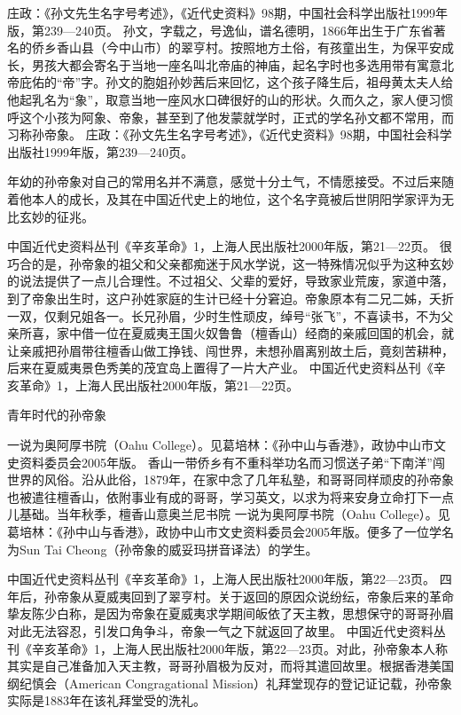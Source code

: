 \documentclass[12pt,UTF8]{ctexbook}
\begin{document}
庄政：《孙文先生名字号考述》，《近代史资料》98期，中国社会科学出版社1999年版，第239—240页。
孙文，字载之，号逸仙，谱名德明，1866年出生于广东省著名的侨乡香山县（今中山市）的翠亨村。按照地方土俗，有孩童出生，为保平安成长，男孩大都会寄名于当地一座名叫北帝庙的神庙，起名字时也多选用带有寓意北帝庇佑的“帝”字。孙文的胞姐孙妙茜后来回忆，这个孩子降生后，祖母黄太夫人给他起乳名为“象”，取意当地一座风水口碑很好的山的形状。久而久之，家人便习惯呼这个小孩为阿象、帝象，甚至到了他发蒙就学时，正式的学名孙文都不常用，而习称孙帝象。 庄政：《孙文先生名字号考述》，《近代史资料》98期，中国社会科学出版社1999年版，第239—240页。

年幼的孙帝象对自己的常用名并不满意，感觉十分土气，不情愿接受。不过后来随着他本人的成长，及其在中国近代史上的地位，这个名字竟被后世阴阳学家评为无比玄妙的征兆。

中国近代史资料丛刊《辛亥革命》1，上海人民出版社2000年版，第21—22页。
很巧合的是，孙帝象的祖父和父亲都痴迷于风水学说，这一特殊情况似乎为这种玄妙的说法提供了一点儿合理性。不过祖父、父辈的爱好，导致家业荒废，家道中落，到了帝象出生时，这户孙姓家庭的生计已经十分窘迫。帝象原本有二兄二姊，夭折一双，仅剩兄姐各一。长兄孙眉，少时生性顽皮，绰号“张飞”，不喜读书，不为父亲所喜，家中借一位在夏威夷王国火奴鲁鲁（檀香山）经商的亲戚回国的机会，就让亲戚把孙眉带往檀香山做工挣钱、闯世界，未想孙眉离别故土后，竟刻苦耕种，后来在夏威夷景色秀美的茂宜岛上置得了一片大产业。 中国近代史资料丛刊《辛亥革命》1，上海人民出版社2000年版，第21—22页。


青年时代的孙帝象

一说为奥阿厚书院（Oahu College）。见葛培林：《孙中山与香港》，政协中山市文史资料委员会2005年版。
香山一带侨乡有不重科举功名而习惯送子弟“下南洋”闯世界的风俗。沿从此俗，1879年，在家中念了几年私塾，和哥哥同样顽皮的孙帝象也被遣往檀香山，依附事业有成的哥哥，学习英文，以求为将来安身立命打下一点儿基础。当年秋季，檀香山意奥兰尼书院 一说为奥阿厚书院（Oahu College）。见葛培林：《孙中山与香港》，政协中山市文史资料委员会2005年版。便多了一位学名为Sun Tai Cheong（孙帝象的威妥玛拼音译法）的学生。

中国近代史资料丛刊《辛亥革命》1，上海人民出版社2000年版，第22—23页。
四年后，孙帝象从夏威夷回到了翠亨村。关于返回的原因众说纷纭，帝象后来的革命挚友陈少白称，是因为帝象在夏威夷求学期间皈依了天主教，思想保守的哥哥孙眉对此无法容忍，引发口角争斗，帝象一气之下就返回了故里。 中国近代史资料丛刊《辛亥革命》1，上海人民出版社2000年版，第22—23页。对此，孙帝象本人称其实是自己准备加入天主教，哥哥孙眉极为反对，而将其遣回故里。根据香港美国纲纪慎会（American Congragational Mission）礼拜堂现存的登记证记载，孙帝象实际是1883年在该礼拜堂受的洗礼。
\end{document}
